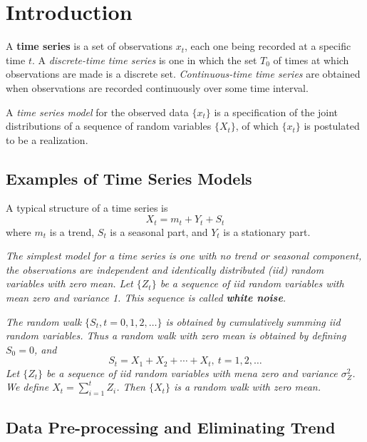 \chapter{Introduction}

A \textbf{time series} is a set of observations $x_t$, each one being recorded at a specific time $t$. A \textit{discrete-time time series} is one in which the set $T_0$ of times at which observations are made is a discrete set. \textit{Continuous-time time series} are obtained when observations are recorded continuously over some time interval.

\begin{definition}
    A \emph{time series model} for the observed data $\{x_t\}$ is a specification of the joint distributions of a sequence of random variables $\{X_t\}$, of which $\{x_t\}$ is postulated to be a realization.
\end{definition}

\section{Examples of Time Series Models}
A typical structure of a time series is 
\[X_t = m_t + Y_t + S_t\]
where $m_t$ is a trend, $S_t$ is a seasonal part, and $Y_t$ is a stationary part.
\begin{example}
    \emph{
        The simplest model for a time series is one with no trend or seasonal component, the observations are independent and identically distributed (iid) random variables with zero mean. Let $\{Z_t\}$ be a sequence of iid random variables with mean zero and variance 1. This sequence is called \textbf{white noise}.
    }    
\end{example}

\begin{example}
    \emph{
        The random walk $\{S_t, t=0,1,2,\ldots\}$ is obtained by cumulatively summing iid random variables. Thus a random walk with zero mean is obtained by defining $S_0 = 0$, and 
        \[S_t = X_1 + X_2 + \cdots + X_t, \ t = 1,2,\ldots\]
        Let $\{Z_t\}$ be a sequence of iid random variables with mena zero and variance $\sigma_Z^2$. We define $X_t = \sum_{i=1}^t Z_i$. Then $\{X_t\}$ is a random walk with zero mean.
    }
\end{example}


\section{Data Pre-processing and Eliminating Trend}

